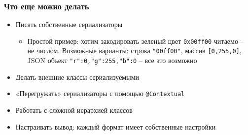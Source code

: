 \documentclass[aspectratio=169]{beamer}
\begin{document}
\begin{frame}
    \frametitle{Что еще можно делать}
    \begin{itemize}
        \item Писать собственные сериализаторы
              \begin{itemize}
                  \item Простой пример: хотим закодировать зеленый цвет \texttt{0x00ff00} читаемо -- не числом.
                        Возможные варианты: строка \texttt{"00ff00"}, массив \texttt{[0,255,0]}, JSON объект \texttt{{"r":0,"g":255,"b":0}} -- все это возможно
              \end{itemize}
        \item Делать внешние классы сериализуемыми
        \item «Перегружать» сериализаторы с помощью \texttt{@Contextual}%
        \item Работать с сложной иерархией классов
        \item Настраивать вывод: каждый формат имеет собственные настройки
    \end{itemize}
\end{frame}
\end{document}
